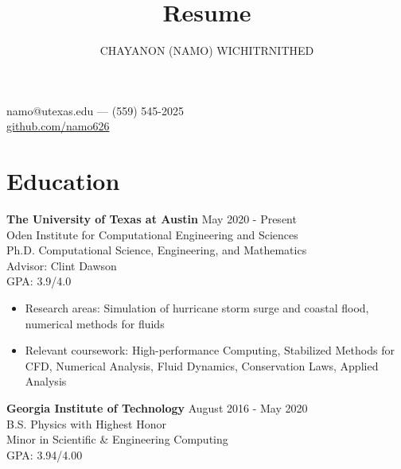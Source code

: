\documentclass[11pt]{article}
\makeatletter
\renewcommand{\maketitle}{
  \begin{center}
    {\Large\bfseries\theauthor}

    namo@utexas.edu --- (559) 545-2025 \\
    \url{github.com/namo626}
  \end{center}
}
\newenvironment{body}{}
\makeatother
\begin{document}
\title{Resume}
\author{CHAYANON (NAMO) WICHITRNITHED}
\maketitle

\section{Education}
\begin{body}
  \textbf{The University of Texas at Austin} \hfill May 2020 - Present\\
  Oden Institute for Computational Engineering and Sciences \\
   Ph.D. Computational Science, Engineering, and Mathematics \\
   Advisor: Clint Dawson \\
    GPA: 3.9/4.0
  \begin{itemize}[leftmargin=*]
    \itemsep0em
    \item Research areas: Simulation of hurricane storm surge and coastal flood, numerical methods for fluids
    \item Relevant coursework: High-performance Computing, Stabilized Methods for CFD, Numerical Analysis, Fluid Dynamics, Conservation Laws, Applied Analysis
  \end{itemize}
\noindent
  \textbf{Georgia Institute of Technology} \hfill August 2016 - May 2020 \\
  B.S. Physics with Highest Honor \\
  Minor in Scientific \& Engineering Computing \\
  GPA: 3.94/4.00
\end{body}
\end{document}
